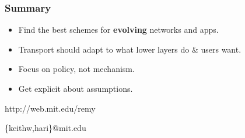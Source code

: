 \documentclass[svgnames]{beamer}
\newcommand{\ssline}{\vspace{8 pt}}
\begin{document}
\begin{frame}
\frametitle{Summary}

\begin{itemize}

\item Find the best schemes for \textbf{evolving} networks and apps.

\item Transport should adapt to what lower layers do \& users want.

\item Focus on policy, not mechanism.

\item Get explicit about assumptions.

\end{itemize}

\ssline

\begin{centering}

http://web.mit.edu/remy

\{keithw,hari\}@mit.edu

\end{centering}

\end{frame}
\end{document}
